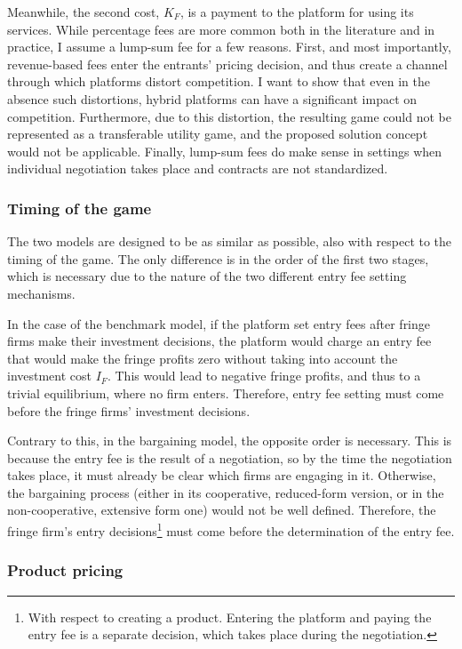 \documentclass[a4paper]{article}
\begin{document}
Meanwhile, the second cost, $K_F$, is a payment to the platform for using its services.
While percentage fees are more common both in the literature and in practice, I assume a lump-sum fee for a few reasons.
First, and most importantly, revenue-based fees enter the entrants' pricing decision, and thus create a channel through which platforms distort competition.
I want to show that even in the absence such distortions, hybrid platforms can have a significant impact on competition.
Furthermore, due to this distortion, the resulting game could not be represented as a transferable utility game, and the proposed solution concept would not be applicable.
Finally, lump-sum fees do make sense in settings when individual negotiation takes place and contracts are not standardized.

\subsubsection{Timing of the game}

The two models are designed to be as similar as possible, also with respect to the timing of the game.
The only difference is in the order of the first two stages, which is necessary due to the nature of the two different entry fee setting mechanisms.

In the case of the benchmark model, if the platform set entry fees after fringe firms make their investment decisions, the platform would charge an entry fee that would make the fringe profits zero without taking into account the investment cost $I_F$.
This would lead to negative fringe profits, and thus to a trivial equilibrium, where no firm enters.
Therefore, entry fee setting must come before the fringe firms' investment decisions.

Contrary to this, in the bargaining model, the opposite order is necessary.
This is because the entry fee is the result of a negotiation, so by the time the negotiation takes place, it must already be clear which firms are engaging in it.
Otherwise, the bargaining process (either in its cooperative, reduced-form version, or in the non-cooperative, extensive form one) would not be well defined.
Therefore, the fringe firm's entry decisions\footnote{
    With respect to creating a product.
    Entering the platform and paying the entry fee is a separate decision, which takes place during the negotiation.
} must come before the determination of the entry fee.

\subsubsection{Product pricing}
\end{document}
